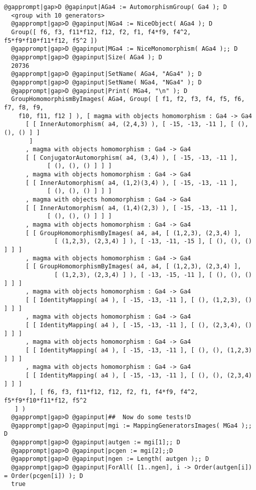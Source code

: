 \documentclass[a4paper,11pt]{report}
\begin{document}
{{\begin{Verbatim}[commandchars=@|D,fontsize=\small,frame=single,label=Example]
  @gapprompt|gap>D @gapinput|AGa4 := AutomorphismGroup( Ga4 ); D
  <group with 10 generators>
  @gapprompt|gap>D @gapinput|NGa4 := NiceObject( AGa4 ); D
  Group([ f6, f3, f11*f12, f12, f2, f1, f4*f9, f4^2, f5*f9*f10*f11*f12, f5^2 ])
  @gapprompt|gap>D @gapinput|MGa4 := NiceMonomorphism( AGa4 );; D
  @gapprompt|gap>D @gapinput|Size( AGa4 ); D
  20736
  @gapprompt|gap>D @gapinput|SetName( AGa4, "AGa4" ); D
  @gapprompt|gap>D @gapinput|SetName( NGa4, "NGa4" ); D
  @gapprompt|gap>D @gapinput|Print( MGa4, "\n" ); D
  GroupHomomorphismByImages( AGa4, Group( [ f1, f2, f3, f4, f5, f6, f7, f8, f9, 
    f10, f11, f12 ] ), [ magma with objects homomorphism : Ga4 -> Ga4
      [ [ InnerAutomorphism( a4, (2,4,3) ), [ -15, -13, -11 ], [ (), (), () ] ] 
       ]
      , magma with objects homomorphism : Ga4 -> Ga4
      [ [ ConjugatorAutomorphism( a4, (3,4) ), [ -15, -13, -11 ], 
            [ (), (), () ] ] ]
      , magma with objects homomorphism : Ga4 -> Ga4
      [ [ InnerAutomorphism( a4, (1,2)(3,4) ), [ -15, -13, -11 ], 
            [ (), (), () ] ] ]
      , magma with objects homomorphism : Ga4 -> Ga4
      [ [ InnerAutomorphism( a4, (1,4)(2,3) ), [ -15, -13, -11 ], 
            [ (), (), () ] ] ]
      , magma with objects homomorphism : Ga4 -> Ga4
      [ [ GroupHomomorphismByImages( a4, a4, [ (1,2,3), (2,3,4) ], 
              [ (1,2,3), (2,3,4) ] ), [ -13, -11, -15 ], [ (), (), () ] ] ]
      , magma with objects homomorphism : Ga4 -> Ga4
      [ [ GroupHomomorphismByImages( a4, a4, [ (1,2,3), (2,3,4) ], 
              [ (1,2,3), (2,3,4) ] ), [ -13, -15, -11 ], [ (), (), () ] ] ]
      , magma with objects homomorphism : Ga4 -> Ga4
      [ [ IdentityMapping( a4 ), [ -15, -13, -11 ], [ (), (1,2,3), () ] ] ]
      , magma with objects homomorphism : Ga4 -> Ga4
      [ [ IdentityMapping( a4 ), [ -15, -13, -11 ], [ (), (2,3,4), () ] ] ]
      , magma with objects homomorphism : Ga4 -> Ga4
      [ [ IdentityMapping( a4 ), [ -15, -13, -11 ], [ (), (), (1,2,3) ] ] ]
      , magma with objects homomorphism : Ga4 -> Ga4
      [ [ IdentityMapping( a4 ), [ -15, -13, -11 ], [ (), (), (2,3,4) ] ] ]
       ], [ f6, f3, f11*f12, f12, f2, f1, f4*f9, f4^2, f5*f9*f10*f11*f12, f5^2 
   ] )
  @gapprompt|gap>D @gapinput|##  Now do some tests!D
  @gapprompt|gap>D @gapinput|mgi := MappingGeneratorsImages( MGa4 );; D
  @gapprompt|gap>D @gapinput|autgen := mgi[1];; D
  @gapprompt|gap>D @gapinput|pcgen := mgi[2];;D
  @gapprompt|gap>D @gapinput|ngen := Length( autgen );; D
  @gapprompt|gap>D @gapinput|ForAll( [1..ngen], i -> Order(autgen[i]) = Order(pcgen[i]) ); D
  true 
  

\end{Verbatim}}}
\end{document}
